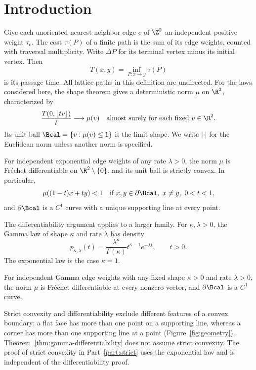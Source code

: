 \section{Introduction}
\label{sec:introduction}

Give each unoriented nearest-neighbor edge $e$ of $\Z^2$ an independent
positive weight $\tau_e$. The cost $\tau(P)$ of a finite path is the sum
of its edge weights, counted with traversal multiplicity. Write
$\Delta P$ for its terminal vertex minus its initial vertex. Then
\[
 T(x,y)=\inf_{P:x\to y}\tau(P)
\]
is its passage time. All lattice paths in this definition are undirected.
For the laws considered here, the shape theorem gives a deterministic
norm $\mu$ on $\R^2$, characterized by
\[
 \frac{T(0,\lfloor tv\rfloor)}t\longrightarrow\mu(v)
 \quad\text{almost surely for each fixed }v\in\R^2.
\]
Its unit ball $\Bcal=\{v:\mu(v)\le1\}$ is the limit shape.
We write $|\cdot|$ for the Euclidean norm unless another norm is specified.

\begin{theorem}
\label{thm:exponential-shape}
For independent exponential edge weights of any rate $\lambda>0$,
the norm $\mu$ is Fr\'echet differentiable on $\R^2\setminus\{0\}$,
and its unit ball is strictly convex. In particular,
\[
 \mu((1-t)x+ty)<1
 \quad\text{if }x,y\in\partial\Bcal,\ x\ne y,\ 0<t<1,
\]
and $\partial\Bcal$ is a $C^1$ curve with a unique supporting line
at every point.
\end{theorem}

The differentiability argument applies to a larger family. For
$\kappa,\lambda>0$, the Gamma law of shape $\kappa$ and rate $\lambda$
has density
\[
 p_{\kappa,\lambda}(t)
 =\frac{\lambda^\kappa}{\Gamma(\kappa)}
   t^{\kappa-1}e^{-\lambda t},\qquad t>0.
\]
The exponential law is the case $\kappa=1$.

\begin{theorem}
\label{thm:gamma-differentiability}
For independent Gamma edge weights with any fixed shape $\kappa>0$
and rate $\lambda>0$, the norm $\mu$ is Fr\'echet differentiable at
every nonzero vector, and $\partial\Bcal$ is a $C^1$ curve.
\end{theorem}

Strict convexity and differentiability exclude different features of a
convex boundary: a flat face has more than one point on a supporting
line, whereas a corner has more than one supporting line at a point
(Figure~\ref{fig:geometry}). Theorem~\ref{thm:gamma-differentiability}
does not assume strict convexity. The proof of strict convexity in
Part~\ref{part:strict} uses the exponential law and is independent of
the differentiability proof.

